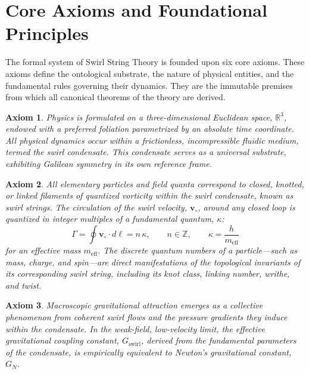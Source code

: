 \documentclass[11pt]{article}
\newcommand{\vswirl}{\mathbf{v}_{\circ}}
\newtheorem{axiom}{Axiom}
\begin{document}
\section{Core Axioms and Foundational Principles}
The formal system of Swirl String Theory is founded upon six core axioms. These axioms define the ontological substrate, the nature of physical entities, and the fundamental rules governing their dynamics. They are the immutable premises from which all canonical theorems of the theory are derived.

\begin{axiom}
Physics is formulated on a three-dimensional Euclidean space, $\mathbb{R}^{3}$, endowed with a preferred foliation parametrized by an absolute time coordinate. All physical dynamics occur within a frictionless, incompressible fluidic medium, termed the \emph{swirl condensate}. This condensate serves as a universal substrate, exhibiting Galilean symmetry in its own reference frame.
\end{axiom}

\begin{axiom}
All elementary particles and field quanta correspond to closed, knotted, or linked filaments of quantized vorticity within the swirl condensate, known as \emph{swirl strings}. The circulation of the swirl velocity, $\vswirl$, around any closed loop is quantized in integer multiples of a fundamental quantum, $\kappa$:
\[
    \Gamma = \oint \vswirl \cdot d\boldsymbol{\ell} = n\,\kappa, \qquad n\in\mathbb{Z}, \qquad \kappa = \frac{h}{m_{\text{eff}}}
\]
for an effective mass $m_{\text{eff}}$. The discrete quantum numbers of a particle—such as mass, charge, and spin—are direct manifestations of the topological invariants of its corresponding swirl string, including its knot class, linking number, writhe, and twist.
\end{axiom}

\begin{axiom}
Macroscopic gravitational attraction emerges as a collective phenomenon from coherent swirl flows and the pressure gradients they induce within the condensate. In the weak-field, low-velocity limit, the effective gravitational coupling constant, $G_{\text{swirl}}$, derived from the fundamental parameters of the condensate, is empirically equivalent to Newton's gravitational constant, $G_N$.
\end{axiom}
\end{document}

